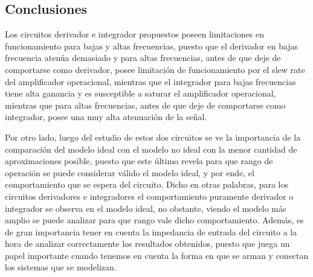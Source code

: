 \subsection{Conclusiones}
Los circuitos derivador e integrador propuestos poseen limitaciones en funcionamiento para bajas y altas
frecuencias, puesto que el derivador en bajas frecuencia aten\'ua demasiado y para altas frecuencias, antes de que deje de comportarse como derivador, posee limitaci\'on de funcionamiento por
el slew rate del amplificador operacional, mientras que el integrador para bajas frecuencias tiene alta ganancia y es susceptible a saturar el amplificador operacional, mientras que para altas frecuencias,
antes de que deje de comportarse como integrador, posee una muy alta atenuaci\'on de la se\~nal.

Por otro lado, luego del estudio de estos dos circuitos se ve la importancia de la comparaci\'on del modelo ideal con el modelo no ideal con la menor
cantidad de aproximaciones posible, puesto que este \'ultimo revela para que rango de operaci\'on se puede considerar v\'alido el modelo ideal, y por ende,
el comportamiento que se espera del circuito. Dicho en otras palabras, para los circuitos derivadores e integradores el comportamiento puramente derivador o integrador
se observa en el modelo ideal, no obstante, viendo el modelo m\'as amplio se puede analizar para que rango vale dicho comportamiento. Adem\'as, es de gran importancia
tener en cuenta la impedancia de entrada del circuito a la hora de analizar correctamente los resultados obtenidos, puesto que juega un papel importante cuando tenemos en cuenta
la forma en que se arman y conectan los sistemas que se modelizan.

